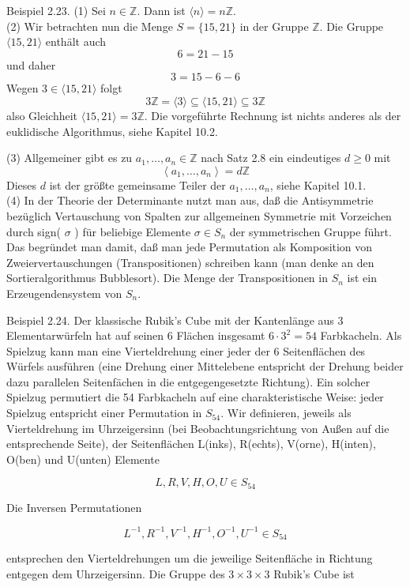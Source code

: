 \documentclass[10pt, letterpaper]{article}
\begin{document}
Beispiel 2.23. (1) Sei $n \in \mathbb{Z}$. Dann ist $\langle n\rangle=n \mathbb{Z}$.\\


(2) Wir betrachten nun die Menge $S=\{15,21\}$ in der Gruppe $\mathbb{Z}$. Die Gruppe $\langle 15,21\rangle$ enthält auch
$$
6=21-15
$$
und daher
$$
3=15-6-6
$$
Wegen $3 \in\langle 15,21\rangle$ folgt
$$
3 \mathbb{Z}=\langle 3\rangle \subseteq\langle 15,21\rangle \subseteq 3 \mathbb{Z}
$$
also Gleichheit $\langle 15,21\rangle=3 \mathbb{Z}$. Die vorgeführte Rechnung ist nichts anderes als der euklidische Algorithmus, siehe Kapitel 10.2.


(3) Allgemeiner gibt es zu $a_{1}, \ldots, a_{n} \in \mathbb{Z}$ nach Satz 2.8 ein eindeutiges $d \geq 0$ mit
$$
\left\langle a_{1}, \ldots, a_{n}\right\rangle=d \mathbb{Z}
$$
Dieses $d$ ist der größte gemeinsame Teiler der $a_{1}, \ldots, a_{n}$, siehe Kapitel 10.1.\\
(4) In der Theorie der Determinante nutzt man aus, daß die Antisymmetrie bezüglich Vertauschung von Spalten zur allgemeinen Symmetrie mit Vorzeichen durch sign( $\sigma$ ) für beliebige Elemente $\sigma \in S_{n}$ der symmetrischen Gruppe führt. Das begründet man damit, daß man jede Permutation als Komposition von Zweiervertauschungen (Transpositionen) schreiben kann (man denke an den Sortieralgorithmus Bubblesort). Die Menge der Transpositionen in $S_{n}$ ist ein Erzeugendensystem von $S_{n}$.


Beispiel 2.24. Der klassische Rubik's Cube mit der Kantenlänge aus 3 Elementarwürfeln hat auf seinen 6 Flächen insgesamt $6 \cdot 3^{2}=54$ Farbkacheln. Als Spielzug kann man eine Vierteldrehung einer jeder der 6 Seitenflächen des Würfels ausführen (eine Drehung einer Mittelebene entspricht der Drehung beider dazu parallelen Seitenfächen in die entgegengesetzte Richtung). Ein solcher Spielzug permutiert die 54 Farbkacheln auf eine charakteristische Weise: jeder Spielzug entspricht einer Permutation in $S_{54}$. Wir definieren, jeweils als Vierteldrehung im Uhrzeigersinn (bei Beobachtungsrichtung von Außen auf die entsprechende Seite), der Seitenflächen L(inks), R(echts), V(orne), H(inten), O(ben) und U(unten) Elemente

$$
L, R, V, H, O, U \in S_{54}
$$

Die Inversen Permutationen

$$
L^{-1}, R^{-1}, V^{-1}, H^{-1}, O^{-1}, U^{-1} \in S_{54}
$$

entsprechen den Vierteldrehungen um die jeweilige Seitenfläche in Richtung entgegen dem Uhrzeigersinn. Die Gruppe des $3 \times 3 \times 3$ Rubik's Cube ist
\end{document}
